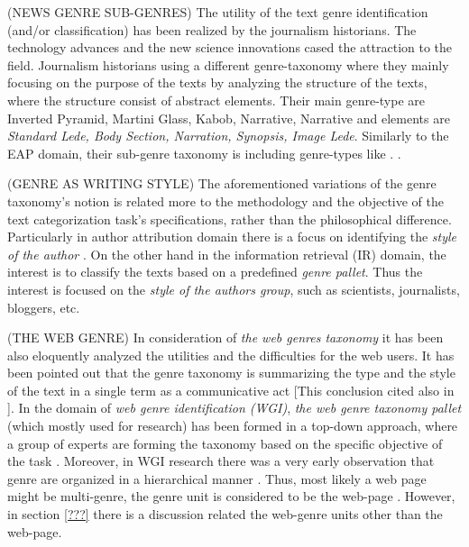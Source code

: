 (NEWS GENRE SUB-GENRES) The utility of the text genre identification (and/or classification) has been realized by the journalism historians. The technology advances and the new science innovations cased the attraction to the field. Journalism historians using a different genre-taxonomy where they mainly focusing on the purpose of the texts by analyzing the structure of the texts, where the structure consist of abstract elements. Their main genre-type are Inverted Pyramid, Martini Glass, Kabob, Narrative, Narrative and elements are \textit{Standard Lede, Body Section,  Narration, Synopsis, Image Lede}.  Similarly to the EAP domain, their sub-genre taxonomy is including genre-types like . \parencite{dai2018fine}.

(GENRE AS WRITING STYLE) The aforementioned variations of the genre taxonomy's notion is related more to the methodology and the objective of the text categorization task's specifications, rather than the philosophical difference. Particularly in author attribution domain there is a focus on identifying the \textit{style of the author} \parencite{stamatatos2009survey,koppel2011authorship,koppel2014determining}. On the other hand in the information retrieval (IR) domain, the interest is to classify the texts based on a predefined \textit{genre pallet}. Thus the interest is focused on the \textit{style of the authors group}, such as scientists, journalists, bloggers, etc.

(THE WEB GENRE) In consideration of \textit{the web genres taxonomy} it has been also eloquently analyzed the utilities and the difficulties for the web users. It has been pointed out that the genre taxonomy is summarizing the type and the style of the text in a single term as a communicative act [This conclusion cited also in \parencite{de2009genre}]. In the domain of \textit{web genre identification (WGI)}, \textit{the web genre taxonomy pallet} (which mostly used for research) has been formed in a top-down approach, where a group of experts are forming the taxonomy based on the specific objective of the task \parencite{crowston2011problems}. Moreover, in WGI research there was a very early observation that genre are organized in a hierarchical manner \parencite{wu2010fine}. Thus, most likely a web page might be multi-genre, the genre unit is considered to be the web-page \parencite{madjarov2015web,jebari2015combination}. However, in section \ref{???} there is a discussion related the web-genre units other than the web-page.

